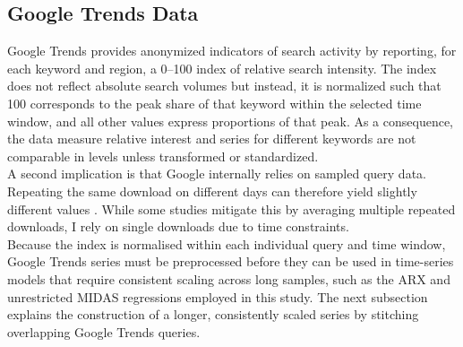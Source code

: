 \documentclass[12pt,a4paper]{article}
\begin{document}
\subsection{Google Trends Data}
Google Trends provides anonymized indicators of search activity by reporting, for each keyword and region, a 0–100 index of relative search intensity. The index does not reflect absolute search volumes but instead, it is normalized such that 100 corresponds to the peak share of that keyword within the selected time window, and all other values express proportions of that peak. As a consequence, the data measure relative interest and series for different keywords are not comparable in levels unless transformed or standardized.\\
A second implication is that Google internally relies on sampled query data. Repeating the same download on different days can therefore yield slightly different values \citep{carrier}.
While some studies mitigate this by averaging multiple repeated downloads, I rely on single downloads due to time constraints.\\
Because the index is normalised within each individual query and time window, Google Trends series must be preprocessed before they can be used in time-series models that require consistent scaling across long samples, such as the ARX and unrestricted MIDAS regressions employed in this study.
The next subsection explains the construction of a longer, consistently scaled series by stitching overlapping Google Trends queries.
\end{document}

